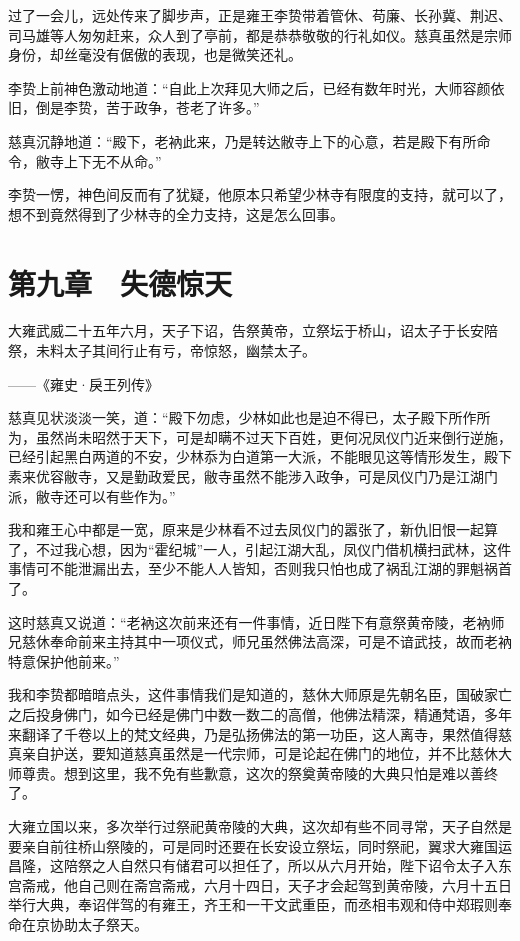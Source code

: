 过了一会儿，远处传来了脚步声，正是雍王李贽带着管休、苟廉、长孙冀、荆迟、司马雄等人匆匆赶来，众人到了亭前，都是恭恭敬敬的行礼如仪。慈真虽然是宗师身份，却丝毫没有倨傲的表现，也是微笑还礼。

李贽上前神色激动地道：“自此上次拜见大师之后，已经有数年时光，大师容颜依旧，倒是李贽，苦于政争，苍老了许多。”

慈真沉静地道：“殿下，老衲此来，乃是转达敝寺上下的心意，若是殿下有所命令，敝寺上下无不从命。”

李贽一愣，神色间反而有了犹疑，他原本只希望少林寺有限度的支持，就可以了，想不到竟然得到了少林寺的全力支持，这是怎么回事。

\chapter{第九章　失德惊天}

大雍武威二十五年六月，天子下诏，告祭黄帝，立祭坛于桥山，诏太子于长安陪祭，未料太子其间行止有亏，帝惊怒，幽禁太子。

——《雍史·戾王列传》

慈真见状淡淡一笑，道：“殿下勿虑，少林如此也是迫不得已，太子殿下所作所为，虽然尚未昭然于天下，可是却瞒不过天下百姓，更何况凤仪门近来倒行逆施，已经引起黑白两道的不安，少林忝为白道第一大派，不能眼见这等情形发生，殿下素来优容敝寺，又是勤政爱民，敝寺虽然不能涉入政争，可是凤仪门乃是江湖门派，敝寺还可以有些作为。”

我和雍王心中都是一宽，原来是少林看不过去凤仪门的嚣张了，新仇旧恨一起算了，不过我心想，因为“霍纪城”一人，引起江湖大乱，凤仪门借机横扫武林，这件事情可不能泄漏出去，至少不能人人皆知，否则我只怕也成了祸乱江湖的罪魁祸首了。

这时慈真又说道：“老衲这次前来还有一件事情，近日陛下有意祭黄帝陵，老衲师兄慈休奉命前来主持其中一项仪式，师兄虽然佛法高深，可是不谙武技，故而老衲特意保护他前来。”

我和李贽都暗暗点头，这件事情我们是知道的，慈休大师原是先朝名臣，国破家亡之后投身佛门，如今已经是佛门中数一数二的高僧，他佛法精深，精通梵语，多年来翻译了千卷以上的梵文经典，乃是弘扬佛法的第一功臣，这人离寺，果然值得慈真亲自护送，要知道慈真虽然是一代宗师，可是论起在佛门的地位，并不比慈休大师尊贵。想到这里，我不免有些歉意，这次的祭奠黄帝陵的大典只怕是难以善终了。

大雍立国以来，多次举行过祭祀黄帝陵的大典，这次却有些不同寻常，天子自然是要亲自前往桥山祭陵的，可是同时还要在长安设立祭坛，同时祭祀，翼求大雍国运昌隆，这陪祭之人自然只有储君可以担任了，所以从六月开始，陛下诏令太子入东宫斋戒，他自己则在斋宫斋戒，六月十四日，天子才会起驾到黄帝陵，六月十五日举行大典，奉诏伴驾的有雍王，齐王和一干文武重臣，而丞相韦观和侍中郑瑕则奉命在京协助太子祭天。

